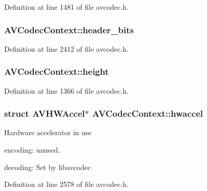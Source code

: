 Definition at line 1481 of file avcodec.\+h.

\subsubsection[{\texorpdfstring{header\+\_\+bits}{header_bits}}]{ A\+V\+Codec\+Context\+::header\+\_\+bits}\hypertarget{struct_a_v_codec_context_af91d7a57d14f1cc5d5fc413755aea3f0}{}\label{struct_a_v_codec_context_af91d7a57d14f1cc5d5fc413755aea3f0}


Definition at line 2412 of file avcodec.\+h.

\subsubsection[{\texorpdfstring{height}{height}}]{ A\+V\+Codec\+Context\+::height}\hypertarget{struct_a_v_codec_context_a0449afd803eb107bd4dbc8b5ea22e363}{}\label{struct_a_v_codec_context_a0449afd803eb107bd4dbc8b5ea22e363}


Definition at line 1366 of file avcodec.\+h.

\subsubsection[{\texorpdfstring{hwaccel}{hwaccel}}]{\setlength{\rightskip}{0pt plus 5cm}struct {\bf A\+V\+H\+W\+Accel}$\ast$ A\+V\+Codec\+Context\+::hwaccel}\hypertarget{struct_a_v_codec_context_ab1030454a58273fd5ab88679b1eed7cc}{}\label{struct_a_v_codec_context_ab1030454a58273fd5ab88679b1eed7cc}
Hardware accelerator in use
\begin{DoxyItemize}
\item encoding\+: unused.
\item decoding\+: Set by libavcodec 
\end{DoxyItemize}

Definition at line 2578 of file avcodec.\+h.


